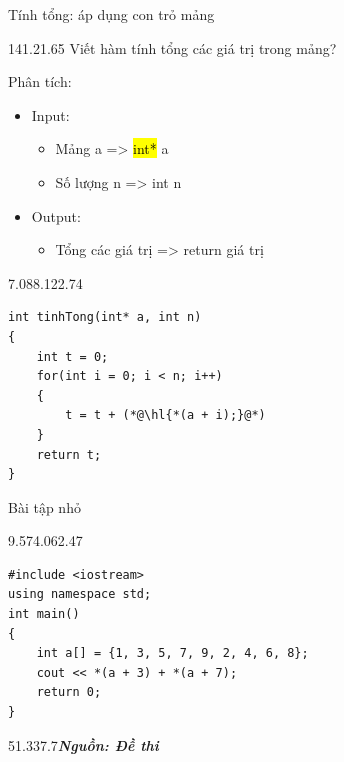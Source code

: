 \begin{frame}[fragile]{Tính tổng: áp dụng con trỏ mảng}
\begin{blk}{14}{1.2}{1.65}
 \small Viết hàm tính tổng các giá trị trong mảng?\par
Phân tích:
\begin{itemize}[itemsep=2pt]
\item Input:
  \begin{itemize}\fontsize{8.5}{10}\selectfont
  \item[\tiny$\blacksquare$] Mảng a \hspace{1.45cm} => \hl{int*} a
  \item[\tiny$\blacksquare$] Số lượng n \hspace{0.75cm} => int n
  \end{itemize}
\item Output:
  \begin{itemize}\fontsize{8.5}{10}\selectfont
  \item[\tiny$\blacksquare$] Tổng các giá trị => return giá trị
  \end{itemize}
\end{itemize}
\end{blk}
\begin{blk}{7.08}{8.12}{2.74}
\begin{lstlisting}[style=red,basicstyle=\cf{11.5}]
int tinhTong(int* a, int n)
{
    int t = 0;
    for(int i = 0; i < n; i++)
    {
        t = t + (*@\hl{*(a + i);}@*)
    }
    return t;
}
\end{lstlisting}
\end{blk}
\end{frame}

\begin{frame}[fragile]{Bài tập nhỏ}
\begin{blk}{9.57}{4.06}{2.47}
\begin{lstlisting}[basicstyle=\cf{11.3}]
#include <iostream>
using namespace std;
int main()
{
    int a[] = {1, 3, 5, 7, 9, 2, 4, 6, 8};
    cout << *(a + 3) + *(a + 7);
    return 0;
}
\end{lstlisting}
\end{blk}
\begin{blk}{5}{1.33}{7.7}\fontsize{8}{9}\selectfont\bfseries\itshape Nguồn: Đề thi\end{blk}
\end{frame}

